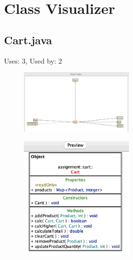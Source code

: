 \documentclass{article}
\begin{document}
\section{Class Visualizer}
\subsection{Cart.java}
Uses: 3, Used by: 2
\begin{figure}[H]
    \centering
    \includegraphics[width=0.5\textwidth]{img/cartDiagram.png}
\end{figure}
\begin{figure}[H]
    \centering
    \includegraphics[width=0.5\textwidth]{img/cartPreview.png}
\end{figure}
\end{document}
